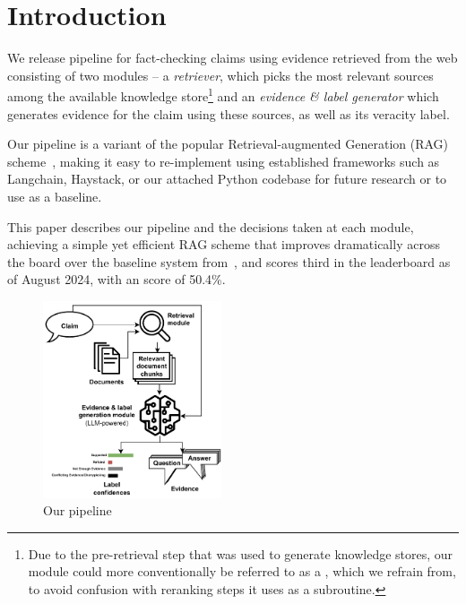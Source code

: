 
\section{Introduction}
\label{sec:introduction}
We release pipeline for fact-checking claims using evidence retrieved from the web consisting of two modules -- a \textit{retriever}, which picks the most relevant sources among the available knowledge store\footnote{Due to the pre-retrieval step that was used to generate knowledge stores, our  module could more conventionally be referred to as a , which we refrain from, to avoid confusion with reranking steps it uses as a subroutine.} and an \textit{evidence \& label generator} which generates evidence for the claim using these sources, as well as its veracity label. 

Our pipeline is a variant of the popular Retrieval-augmented Generation (RAG) scheme~\cite{rag}, making it easy to re-implement using established frameworks such as Langchain, Haystack, or our attached Python codebase for future research or to use as a baseline.

This paper describes our pipeline and the decisions taken at each module, achieving a simple yet efficient RAG scheme that improves dramatically across the board over the baseline system from~\cite{averitec2024}, and scores third in the \averitec{} leaderboard as of August 2024, with an \averitec{} score of 50.4\%.

\begin{figure}[h]
    \centering
    \includegraphics[width=0.47\textwidth]{figures/pipeline.pdf}
    \caption{Our pipeline}
    \label{fig:pipeline}
\end{figure}

